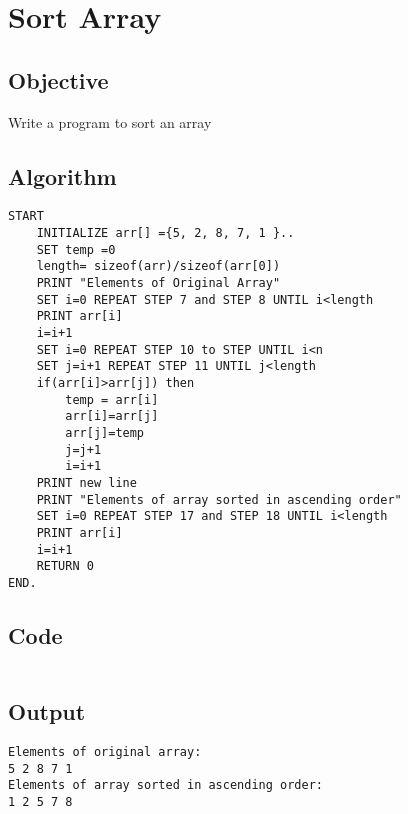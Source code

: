 \section{Sort Array}
\label{sec:Sort Array}

\subsection{Objective}
Write a program to sort an array

\subsection{Algorithm}
\begin{lstlisting}[style=mystyle]
START
    INITIALIZE arr[] ={5, 2, 8, 7, 1 }..
    SET temp =0
    length= sizeof(arr)/sizeof(arr[0])
    PRINT "Elements of Original Array"
    SET i=0 REPEAT STEP 7 and STEP 8 UNTIL i<length
    PRINT arr[i]
    i=i+1
    SET i=0 REPEAT STEP 10 to STEP UNTIL i<n
    SET j=i+1 REPEAT STEP 11 UNTIL j<length
    if(arr[i]>arr[j]) then
        temp = arr[i]
        arr[i]=arr[j]
        arr[j]=temp
        j=j+1
        i=i+1
    PRINT new line
    PRINT "Elements of array sorted in ascending order"
    SET i=0 REPEAT STEP 17 and STEP 18 UNTIL i<length
    PRINT arr[i]
    i=i+1
    RETURN 0
END.
\end{lstlisting}

\subsection{Code}
\inputminted[]{c}{../../Code/csort.c}

\subsection{Output}
\begin{lstlisting}[style=output]
Elements of original array: 
5 2 8 7 1 
Elements of array sorted in ascending order: 
1 2 5 7 8  
\end{lstlisting}

\pagebreak
